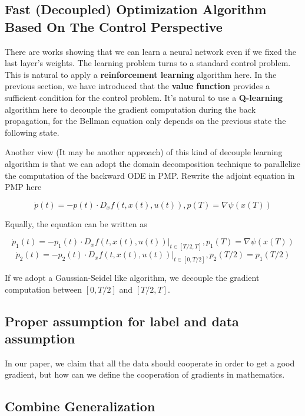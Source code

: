 \documentclass{article}
\theoremstyle{plain}
\theoremstyle{definition}
\begin{document}
\subsection{Fast (Decoupled) Optimization Algorithm Based On The Control Perspective}

There are works showing that we can learn a neural network even if we fixed the last layer's weights. The learning problem turns to a standard control problem. This is natural to apply a \textbf{reinforcement learning} algorithm here. In the previous section, we have introduced that the \textbf{value function} provides a sufficient condition for the control problem. It's natural to use a \textbf{Q-learning} algorithm here to decouple the gradient computation during the back propagation, for the Bellman equation only depends on the previous state the following state.


Another view (It may be another approach) of this kind of decouple learning algorithm is that we can adopt the domain decomposition technique to parallelize the computation of the backward ODE in PMP. Rewrite the adjoint equation in PMP here

$$
\dot p(t) = -p(t)\cdot D_xf(t,x(t),u(t)),p(T)=\nabla \psi(x(T))
$$

Equally, the equation can be written as

$$
\dot p_1(t) = -p_1(t)\cdot D_xf(t,x(t),u(t))|_{t\in[T/2,T]},p_1(T)=\nabla \psi(x(T))$$
$$
\dot p_2(t) = -p_2(t)\cdot D_xf(t,x(t),u(t))|_{t\in[0,T/2]},p_2(T/2)=p_1(T/2)
$$

If we adopt a Gaussian-Seidel like algorithm, we decouple the gradient computation between $[0,T/2]$ and $[T/2,T]$.

\subsection{Proper assumption for label and data assumption}

In our paper, we claim that all the data should cooperate in order to get a good gradient, but how can we define the cooperation of gradients in mathematics.

\subsection{Combine Generalization}
\end{document}
